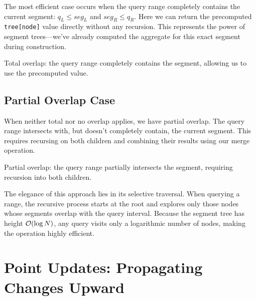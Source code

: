 The most efficient case occurs when the query range completely contains the current segment: $q_L \leq seg_L$ and $seg_R \leq q_R$. Here we can return the precomputed \texttt{tree[node]} value directly without any recursion. This represents the power of segment trees—we've already computed the aggregate for this exact segment during construction.

\begin{marginfigure}
\caption{Total overlap: the query range completely contains the segment, allowing us to use the precomputed value.}
\label{fig:total-overlap}
\end{marginfigure}

\subsection{Partial Overlap Case}

When neither total nor no overlap applies, we have partial overlap. The query range intersects with, but doesn't completely contain, the current segment. This requires recursing on both children and combining their results using our merge operation.

\begin{marginfigure}
\caption{Partial overlap: the query range partially intersects the segment, requiring recursion into both children.}
\label{fig:partial-overlap}
\end{marginfigure}


The elegance of this approach lies in its selective traversal. When querying a range, the recursive process starts at the root and explores only those nodes whose segments overlap with the query interval. Because the segment tree has height $\mathcal{O}(\log N)$, any query visits only a logarithmic number of nodes, making the operation highly efficient.

\section{Point Updates: Propagating Changes Upward}
\label{sec:point_update_recursion}

